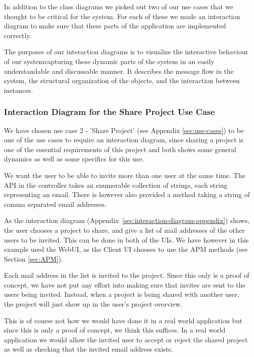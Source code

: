 In addition to the class diagrams we picked out two of our use cases that we thought to be critical for the system. For each of these we made an interaction diagram
to make sure that these parts of the application are implemented correctly. 

The purposes of our interaction diagrams is to visualize the interactive behaviour of our systemcapturing these dynamic parts of 
the system in an easily understandable and discussable manner. It describes the message flow in the system, the structural organization
of the objects, and the interaction between instances.

\subsubsection{Interaction Diagram for the Share Project Use Case}

We have chosen use case 2 - 'Share Project' (see Appendix \ref{sec:use-cases}) to be one of the use cases to require an interaction diagram, since sharing a project is one of the essential
requirements of this project and both shows some general dynamics as well as some specifics for this use.

We want the user to be able to invite more than one user at the same time. The API in the controller takes an enumerable collection of strings, each string
representing an email. There is however also provided a method taking a string of comma separated email addresses.

As the interaction diagram (Appendix~\ref{sec:interaction-diagram-appendix}) shows, the user chooses a project to share, and give a list of mail
addresses of the other users to be invited. This can be done in both of the UIs. We have however in this example used the WebUI, as the Client UI
chooses to use the APM methods (see Section \ref{sec:APM}). 

Each mail address in the list is invited to the project. Since this only is a proof of concept, we have not put any effort into making sure that invites 
are sent to the users being invited. Instead, when a project is being shared with another user, the project will just show up in the user's project overview.

This is of course not how we would have done it in a real world application but since this is only a proof of concept, we think this suffices. In a 
real world application we would allow the invited user to accept or reject the shared project as well as checking that the invited email address exists.

